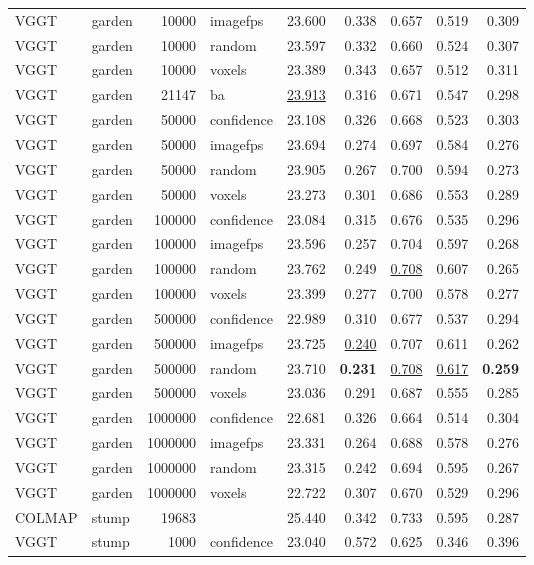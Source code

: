 \begin{table}[H]
\begin{tabular}{llrlrrrrr}
VGGT & garden & 10000 & imagefps & 23.600 & 0.338 & 0.657 & 0.519 & 0.309 \\
VGGT & garden & 10000 & random & 23.597 & 0.332 & 0.660 & 0.524 & 0.307 \\
VGGT & garden & 10000 & voxels & 23.389 & 0.343 & 0.657 & 0.512 & 0.311 \\
VGGT & garden & 21147 & ba & \underline{23.913} & 0.316 & 0.671 & 0.547 & 0.298 \\
VGGT & garden & 50000 & confidence & 23.108 & 0.326 & 0.668 & 0.523 & 0.303 \\
VGGT & garden & 50000 & imagefps & 23.694 & 0.274 & 0.697 & 0.584 & 0.276 \\
VGGT & garden & 50000 & random & 23.905 & 0.267 & 0.700 & 0.594 & 0.273 \\
VGGT & garden & 50000 & voxels & 23.273 & 0.301 & 0.686 & 0.553 & 0.289 \\
VGGT & garden & 100000 & confidence & 23.084 & 0.315 & 0.676 & 0.535 & 0.296 \\
VGGT & garden & 100000 & imagefps & 23.596 & 0.257 & 0.704 & 0.597 & 0.268 \\
VGGT & garden & 100000 & random & 23.762 & 0.249 & \underline{0.708} & 0.607 & 0.265 \\
VGGT & garden & 100000 & voxels & 23.399 & 0.277 & 0.700 & 0.578 & 0.277 \\
VGGT & garden & 500000 & confidence & 22.989 & 0.310 & 0.677 & 0.537 & 0.294 \\
VGGT & garden & 500000 & imagefps & 23.725 & \underline{0.240} & 0.707 & 0.611 & 0.262 \\
VGGT & garden & 500000 & random & 23.710 & \textbf{0.231} & \underline{0.708} & \underline{0.617} & \textbf{0.259} \\
VGGT & garden & 500000 & voxels & 23.036 & 0.291 & 0.687 & 0.555 & 0.285 \\
VGGT & garden & 1000000 & confidence & 22.681 & 0.326 & 0.664 & 0.514 & 0.304 \\
VGGT & garden & 1000000 & imagefps & 23.331 & 0.264 & 0.688 & 0.578 & 0.276 \\
VGGT & garden & 1000000 & random & 23.315 & 0.242 & 0.694 & 0.595 & 0.267 \\
VGGT & garden & 1000000 & voxels & 22.722 & 0.307 & 0.670 & 0.529 & 0.296 \\
\midrule
COLMAP & stump & 19683 &  & 25.440 & 0.342 & 0.733 & 0.595 & 0.287 \\
VGGT & stump & 1000 & confidence & 23.040 & 0.572 & 0.625 & 0.346 & 0.396 \\

\end{tabular}
\end{table}
